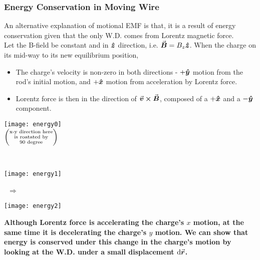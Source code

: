 \documentclass[class=article, crop=false, 12pt]{standalone}
\begin{document}
\subsubsection{Energy Conservation in Moving Wire}

An alternative explanation of motional EMF is that,
it is a result of energy conservation given that the only W.D. comes from Lorentz magnetic force.\\

Let the B-field be constant and in $\vu*{z}$ direction, i.e. $\va*{B}=B_z\vu*{z}$.
When the charge on its mid-way to its new equilibrium position, 
\begin{itemize}
    \item The charge's velocity is non-zero in both directions - 
    $+\vu*{y}$ motion from the rod's initial motion,
    and $+\vu*{x}$ motion from acceleration by Lorentz force.

    \item Lorentz force is then in the direction of $\va*{v}\cross\va*{B}$,
    composed of a $+\vu*{x}$ and a $-\vu*{y}$ component.
    
\end{itemize} 

\begin{center}
    \begin{minipage}{0.2\linewidth}
        \centering
        \texttt{[image: energy0]}\\[1em]
        $\qty(\substack{\text{x-y direction here}\\\text{is roatated by}\\\text{90 degree}})$
    \end{minipage}
    \ 
    \begin{minipage}{0.3\linewidth}
        \centering
        \texttt{[image: energy1]}
    \end{minipage}
    {\huge\ $\Rightarrow$\ }
    \begin{minipage}{0.3\linewidth}
        \centering
        \texttt{[image: energy2]}
    \end{minipage}
\end{center}

\bf{Although Lorentz force is accelerating the charge's $x$ motion,
at the same time it is decelerating the charge's $y$ motion.}
We can show that energy is conserved under this change in the charge's motion 
by looking at the W.D. under a small displacement $\dd{\va*{r}}$.
\end{document}
